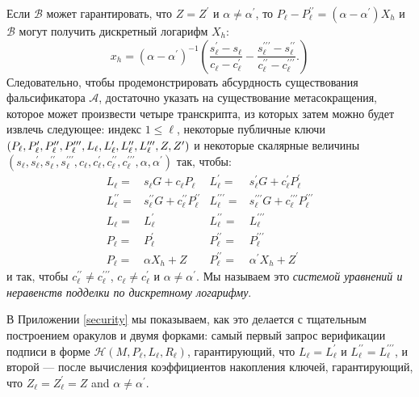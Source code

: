 \documentclass{mrl}
\theoremstyle{definition}
\numberwithin{theorem}{subsection}
\newcommand{\adversary}{\mathcal{A}}
\begin{document}
Если $\mathcal{B}$ может гарантировать, что $Z = Z^\prime$ и $\alpha \neq \alpha^\prime$, то $P_\ell - P_\ell^{\prime \prime} = (\alpha - \alpha^\prime)X_h$ и $\mathcal{B}$ могут получить дискретный логарифм $X_h$: \[x_h = (\alpha - \alpha^\prime)^{-1}\left(\frac{s_\ell^\prime - s_\ell}{c_\ell - c_\ell^\prime} - \frac{s_\ell^{\prime \prime \prime} - s_\ell^{\prime \prime}}{c_\ell^{\prime \prime} - c_\ell^{\prime \prime \prime}}.\right)\] Следовательно, чтобы продемонстрировать абсурдность существования фальсификатора $\adversary$, достаточно указать на существование метасокращения, которое может произвести четыре транскрипта, из которых затем можно будет извлечь следующее: индекс $1 \leq \ell$, некоторые публичные ключи $(P_\ell, P_\ell^\prime, P_\ell^{\prime \prime}, P_\ell^{\prime \prime \prime}, \linebreak L_\ell, L_\ell^\prime, L_\ell^{\prime \prime}, L_\ell^{\prime \prime \prime}, Z, Z^\prime)$ и некоторые скалярные величины $(s_\ell, s_\ell^\prime, s_\ell^{\prime \prime}, s_\ell^{\prime \prime \prime}, c_\ell, c_\ell^\prime, c_\ell^{\prime \prime}, c_\ell^{\prime \prime \prime}, \alpha, \alpha^\prime)$ так, чтобы:
\begin{align*}
L_\ell = & s_\ell G + c_\ell P_\ell &
L_{\ell}^\prime =& s_\ell^\prime G + c_\ell^\prime P_\ell^\prime\\
L_\ell^{\prime \prime} =& s_\ell^{\prime \prime} G + c_\ell^{\prime \prime} P_\ell^{\prime \prime} &
L_{\ell}^{\prime \prime \prime} =& s_\ell^{\prime\prime \prime} G + c_\ell^{\prime \prime \prime} P_\ell^{\prime \prime\prime}\\
L_\ell =& L_\ell^{\prime} &
L_\ell^{\prime \prime} =& L_\ell^{\prime \prime \prime}\\
P_\ell =& P_\ell^{\prime} &
P_\ell^{\prime \prime} =& P_\ell^{\prime \prime \prime}\\
P_\ell =& \alpha X_h + Z &
P_\ell^{\prime \prime} =& \alpha^\prime X_h + Z^\prime
\end{align*} и так, чтобы $c_\ell^{\prime \prime} \neq c_\ell^{\prime \prime \prime}$, $c_\ell \neq c_\ell^\prime$ и $\alpha \neq \alpha^\prime$. Мы называем это \textit{системой уравнений и неравенств подделки по дискретному логарифму}.

В Приложении \ref{security} мы показываем, как это делается с тщательным построением оракулов и двумя форками: самый первый запрос верификации подписи в форме $\mathcal{H}(M,P_\ell,L_\ell,R_\ell)$, гарантирующий, что $L_\ell = L_\ell^\prime$ и $L_\ell^{\prime \prime} = L_\ell^{\prime \prime \prime}$, и второй — после вычисления коэффициентов накопления ключей, гарантирующий, что $Z_\ell = Z_\ell^\prime = Z$ and $\alpha \neq \alpha^\prime$.
\end{document}
